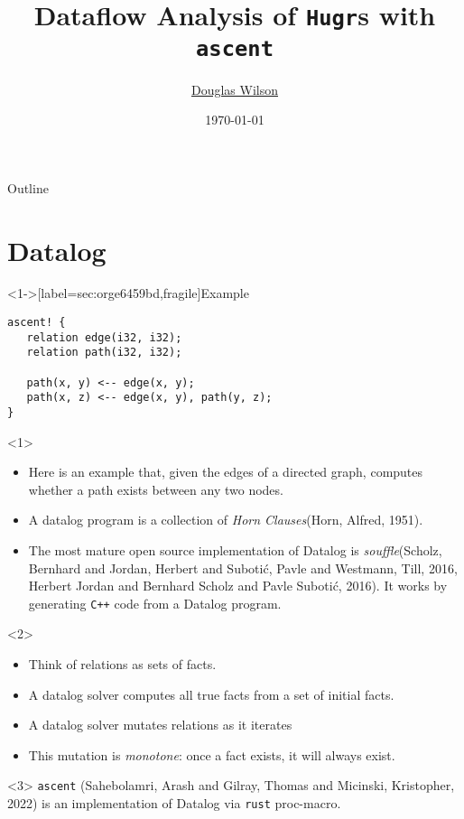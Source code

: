 \documentclass[presentation]{beamer}
\author{\href{mailto:douglas.wilson@quantinuum.com}{Douglas Wilson}}
\date{\today}
\title{Dataflow Analysis of \texttt{Hugr}​s with \texttt{ascent}}
\begin{document}
\maketitle
\begin{frame}{Outline}
\tableofcontents
\end{frame}

\section{Datalog}
\label{sec:orgb46bb52}
\begin{frame}<1->[label={sec:orge6459bd},fragile]{Example}
 \begin{verbatim}
ascent! {
   relation edge(i32, i32);
   relation path(i32, i32);

   path(x, y) <-- edge(x, y);
   path(x, z) <-- edge(x, y), path(y, z);
}
\end{verbatim}
\begin{onlyenv}<1>
\begin{itemize}
\item Here is an example that, given the edges of a directed graph, computes whether a path exists between any two nodes.

\item A datalog program is a collection of \emph{Horn Clauses}(Horn, Alfred, 1951).

\item The most mature open source implementation of Datalog is \emph{souffle}(Scholz, Bernhard and Jordan, Herbert and Suboti\'{c}, Pavle and Westmann, Till, 2016,  Herbert Jordan and Bernhard Scholz and Pavle Suboti{\'c}, 2016). It works by generating \texttt{C++} code from a Datalog program.
\end{itemize}
\end{onlyenv}
\begin{onlyenv}<2>
\begin{itemize}
\item Think of relations as sets of facts.
\item A datalog solver computes all true facts from a set of initial facts.
\item A datalog solver mutates relations as it iterates
\item This mutation is \emph{monotone}: once a fact exists, it will always exist.
\end{itemize}
\end{onlyenv}
\begin{onlyenv}<3>
\texttt{ascent} (Sahebolamri, Arash and Gilray, Thomas and Micinski, Kristopher, 2022) is an implementation of Datalog via \texttt{rust} proc-macro.


\end{onlyenv}
\end{frame}
\end{document}
